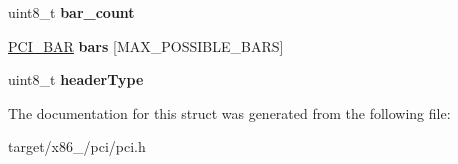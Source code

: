 \begin{DoxyCompactItemize}
\item 
uint8\+\_\+t {\bfseries bar\+\_\+count}\hypertarget{structPCI__DeviceFuncs_aa0dc38edb7b343260f8e7bc4eac7fd03}{}\label{structPCI__DeviceFuncs_aa0dc38edb7b343260f8e7bc4eac7fd03}

\item 
\hyperlink{structPCI__BAR}{P\+C\+I\+\_\+\+B\+AR} {\bfseries bars} \mbox{[}M\+A\+X\+\_\+\+P\+O\+S\+S\+I\+B\+L\+E\+\_\+\+B\+A\+RS\mbox{]}\hypertarget{structPCI__DeviceFuncs_a7a7694e858c3a5397a770373fa6d9cd7}{}\label{structPCI__DeviceFuncs_a7a7694e858c3a5397a770373fa6d9cd7}

\item 
uint8\+\_\+t {\bfseries header\+Type}\hypertarget{structPCI__DeviceFuncs_a57b3eb34e259ca5ad4c353b966c358e1}{}\label{structPCI__DeviceFuncs_a57b3eb34e259ca5ad4c353b966c358e1}

\end{DoxyCompactItemize}


The documentation for this struct was generated from the following file\+:\begin{DoxyCompactItemize}
\item 
target/x86\+\_/pci/pci.\+h\end{DoxyCompactItemize}
